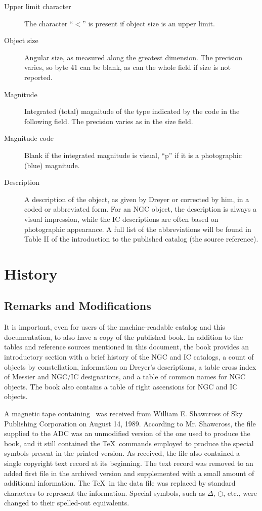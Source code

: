 \begin{description}
\item[Upper limit character] The character ``$<$'' is present if object size is
an upper limit.

\item[Object size] Angular size, as measured along the greatest dimension. The
precision varies, so byte 41 can be blank, as can the whole field if size is not
reported.

\item[Magnitude] Integrated (total) magnitude of the type indicated by the code
in the following field. The precision varies as in the size field.

\item[Magnitude code] Blank if the integrated magnitude is visual, ``p'' if it
is a photographic (blue) magnitude.

\item[Description] A description of the object, as given by Dreyer or corrected
by him, in a coded or abbreviated form. For an NGC object, the description is
always a visual impression, while the IC descriptions are often based on
photographic appearance. A full list of the abbreviations will be found in Table
II of the introduction to the published catalog (the source reference).

\end{description}

\section{History}

\subsection{Remarks and Modifications}

It is important, even for users of the machine-readable catalog and this
documentation, to also have a copy of the published book. In addition to the
tables and reference sources mentioned in this document, the book provides an
introductory section with a brief history of the NGC and IC catalogs, a count of
objects by constellation, information on Dreyer's descriptions, a table cross
index of Messier and NGC/IC designations, and a table of common names for NGC
objects. The book also contains a table of right ascensions for NGC and IC
objects.

A magnetic tape containing \cat\ was received from William E. Shawcross of Sky
Publishing Corporation on August 14, 1989. According to Mr. Shawcross, the file
supplied to the ADC was an unmodified version of the one used to produce the
book, and it still contained the \TeX\ commands employed to produce the special
symbols present in the printed version. As received, the file also contained a
single copyright text record at its beginning. The text record was removed to an
added first file in the archived version and supplemented with a small amount of
additional information. The \TeX\ in the data file was replaced by standard
characters to represent the information. Special symbols, such as $\Delta$,
$\bigcirc$, etc., were changed to their spelled-out equivalents.

